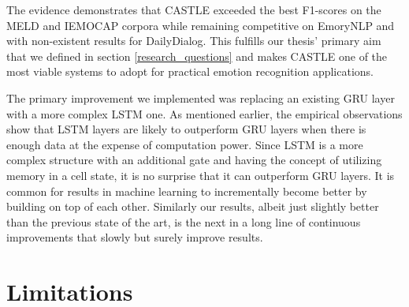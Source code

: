\documentclass[nofilelist]{cslthse-msc}
\begin{document}

The evidence demonstrates that CASTLE exceeded the best F1-scores on the MELD and IEMOCAP corpora while remaining competitive on EmoryNLP and with non-existent results for DailyDialog. This fulfills our thesis' primary aim that we defined in section \ref{research_questions} and makes CASTLE one of the most viable systems to adopt for practical emotion recognition applications.

The primary improvement we implemented was replacing an existing GRU layer with a more complex LSTM one. As mentioned earlier, the empirical observations show that LSTM layers are likely to outperform GRU layers when there is enough data at the expense of computation power. Since LSTM is a more complex structure with an additional gate and having the concept of utilizing memory in a cell state, it is no surprise that it can outperform GRU layers. It is common for results in machine learning to incrementally become better by building on top of each other. Similarly our results, albeit just slightly better than the previous state of the art, is the next in a long line of continuous improvements that slowly but surely improve results.









\section{Limitations}
\label{limitations}
\end{document}
